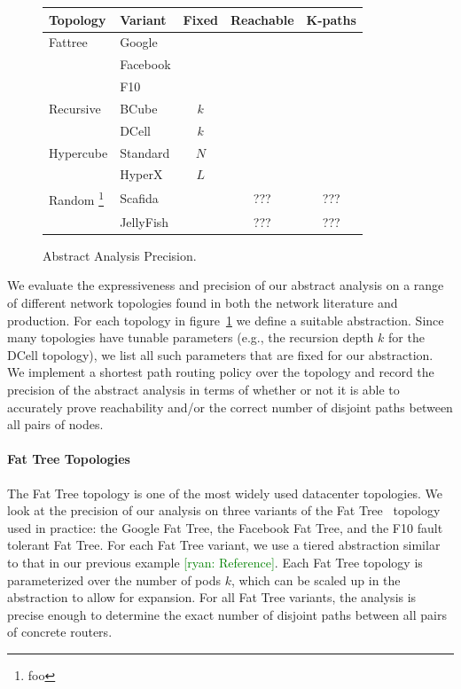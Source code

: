 \documentclass{sig-alternate-10pt}
\newcommand{\cmark}{\ding{51}}
\newcommand{\xmark}{\ding{55}}
\newcommand{\ryan}[1]{\textcolor{green}{[ryan: #1]}}
\newcommand{\para}[1]{\paragraph*{\textbf{#1}}}
\begin{document}
\begin{figure}[t!]
  \begin{center}
      \begin{tabular}{| l l | c | c | c |}
      \hline
      \textbf{Topology} & \textbf{Variant} & \textbf{Fixed} & \textbf{Reachable} & \textbf{K-paths} \\ \hline
      Fattree 
         & Google &  & \cmark & \cmark  \\ 
         & Facebook &  & \cmark & \cmark \\
         & F10 &  & \cmark & \cmark \\ \hline
      Recursive
         & BCube & $k$ & \cmark & \xmark \\
         & DCell & $k$ & \cmark & \xmark \\ \hline
      Hypercube
         & Standard & $N$ & \cmark & \cmark \\
         & HyperX & $L$ & \cmark & \cmark \\ \hline
      Random \footnote{foo}
         & Scafida &  & ??? & ??? \\
         & JellyFish &  & ??? & ??? \\

      \hline
      \end{tabular}
  \end{center}
  \caption{Abstract Analysis Precision.}
  \label{fig:analysis-precision}
\end{figure}

We evaluate the expressiveness and precision of our abstract analysis on a range of different network topologies found in both the network literature and production. For each topology in figure~\ref{fig:analysis-precision} we define a suitable abstraction. Since many topologies have tunable parameters (e.g., the recursion depth $k$ for the DCell topology), we list all such parameters that are fixed for our abstraction. We implement a shortest path routing policy over the topology and record the precision of the abstract analysis in terms of whether or not it is able to accurately prove reachability and/or the correct number of disjoint paths between all pairs of nodes.

\para{Fat Tree Topologies}

The Fat Tree topology is one of the most widely used datacenter topologies. We look at the precision of our analysis on three variants of the Fat Tree~\cite{foo} topology used in practice: the Google Fat Tree, the Facebook Fat Tree, and the F10 fault tolerant Fat Tree. For each Fat Tree variant, we use a tiered abstraction similar to that in our previous example \ryan{Reference}. Each Fat Tree topology is parameterized over the number of pods $k$, which can be scaled up in the abstraction to allow for expansion. For all Fat Tree variants, the analysis is precise enough to determine the exact number of disjoint paths between all pairs of concrete routers.
\end{document}
